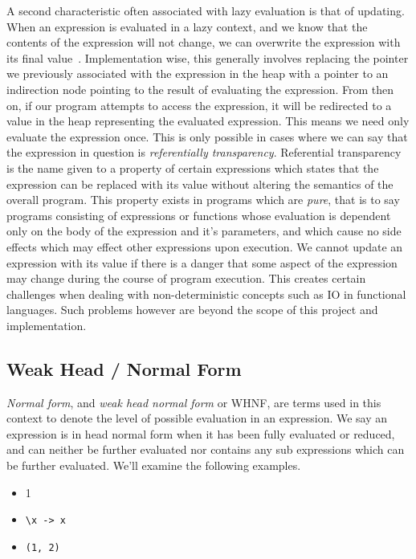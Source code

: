 A second characteristic often associated with lazy evaluation is that of 
updating. When an expression is evaluated in a lazy context, and we know
that the contents of the expression will not change, we can overwrite the
expression with its final value~\cite[pp.208]{SPJ}. Implementation wise, this generally involves
replacing the pointer we previously associated with the expression in the
heap with a pointer to an indirection node pointing to the result of 
evaluating the expression. From then on, if our program attempts to 
access the expression, it will be redirected to a value in the heap 
representing the evaluated expression. This means we need only evaluate
the expression once. This is only possible in cases where
we can say that the expression in question is \emph{referentially transparency}. 
Referential transparency is the name
given to a property of certain expressions which states that the expression
can be replaced with its value without altering the semantics of the overall
program. This property exists in programs which are \emph{pure}, that is to
say programs consisting of expressions or functions whose evaluation is 
dependent only on the body of the expression and it's parameters, and which
cause no side effects which may effect other expressions upon execution. 
We cannot update an expression with its value if there is a danger that
some aspect of the expression may change during the course of program 
execution. This creates certain challenges when dealing with non-deterministic
concepts such as IO in functional languages. Such problems however are 
beyond the scope of this project and implementation.

\subsection{Weak Head / Normal Form}
\emph{Normal form}, and \emph{weak head normal form} or WHNF, are terms used
in this context to denote the level of possible evaluation in an expression.
We say an expression is in head normal form when it has been fully evaluated
or reduced, and can neither be further evaluated nor contains any sub
expressions which can be further evaluated. We'll examine the following examples.

\begin{itemize}
 \item 1
 \item \verb!\x -> x!
 \item \verb!(1, 2)!
\end{itemize}

